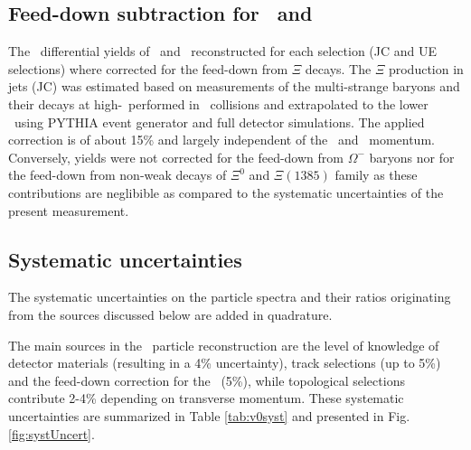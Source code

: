 
\subsection{Feed-down subtraction for \lda\ and \alda}

The \pt\ differential yields of \lda\ and \alda\ reconstructed for each selection (JC and UE selections) where corrected for the feed-down from $\Xi$ decays. 
The $\Xi$ production in jets (JC) was estimated based on measurements of the multi-strange baryons and their decays at high-\pt\ performed in \pp\ collisions \cite{Abelev:2012jp} and extrapolated to the lower \pt\ using PYTHIA event generator and full detector simulations.
The applied correction is of about 15\% and largely independent of the \lda\ and \alda\ momentum. 
Conversely, \lda yields were not corrected for the feed-down from $\Omega^{-}$ baryons nor for the feed-down from non-weak decays of $\Xi^{0}$ and $\Xi(1385)$ family as these contributions are neglibible as compared to the systematic uncertainties of the present measurement.


\subsection{Systematic uncertainties}
\label{sec:uncertainties}


The systematic uncertainties on the particle spectra and their ratios originating from the sources discussed below are added in quadrature.

The main sources in the \Vzero\ particle reconstruction are the level of knowledge of detector materials (resulting in a 4\% uncertainty), track selections (up to 5\%) and the feed-down correction for the \lda\ (5\%), while topological selections contribute 2-4\% depending on transverse momentum. 
These systematic uncertainties are summarized in Table \ref{tab:v0syst} and presented in Fig. \ref{fig:systUncert}.

